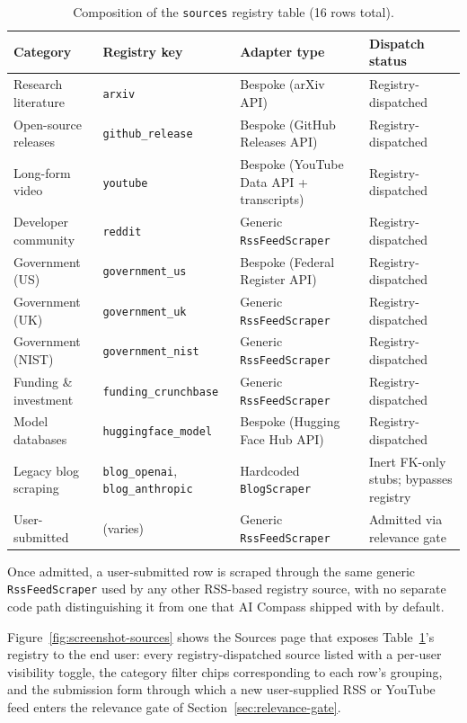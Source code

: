 \begin{table}[htbp]
\centering
\caption{Composition of the \texttt{sources} registry table (16 rows total).}
\label{tab:sources}
\small
\begin{tabular}{|p{2.3cm}|p{3.4cm}|p{4.4cm}|p{2.6cm}|}
\hline
\textbf{Category} & \textbf{Registry key} & \textbf{Adapter type} & \textbf{Dispatch status} \\
\hline
Research literature & \texttt{arxiv} & Bespoke (arXiv API) & Registry-dispatched \\
\hline
Open-source releases & \texttt{github\_\allowbreak release} & Bespoke (GitHub Releases API) & Registry-dispatched \\
\hline
Long-form video & \texttt{youtube} & Bespoke (YouTube Data API + transcripts) & Registry-dispatched \\
\hline
Developer community & \texttt{reddit} & Generic \texttt{RssFeedScraper} & Registry-dispatched \\
\hline
Government (US) & \texttt{government\_\allowbreak us} & Bespoke (Federal Register API) & Registry-dispatched \\
\hline
Government (UK) & \texttt{government\_\allowbreak uk} & Generic \texttt{RssFeedScraper} & Registry-dispatched \\
\hline
Government (NIST) & \texttt{government\_\allowbreak nist} & Generic \texttt{RssFeedScraper} & Registry-dispatched \\
\hline
Funding \& investment & \texttt{funding\_\allowbreak crunchbase} & Generic \texttt{RssFeedScraper} & Registry-dispatched \\
\hline
Model databases & \texttt{huggingface\_\allowbreak model} & Bespoke (Hugging Face Hub API) & Registry-dispatched \\
\hline
Legacy blog scraping & \texttt{blog\_openai}, \texttt{blog\_\allowbreak anthropic} & Hardcoded \texttt{BlogScraper} & Inert FK-only stubs; bypasses registry \\
\hline
User-submitted & (varies) & Generic \texttt{RssFeedScraper} & Admitted via relevance gate \\
\hline
\end{tabular}
\end{table}

Once admitted, a user-submitted row is scraped through the same generic \texttt{RssFeedScraper} used by any other RSS-based registry source, with no separate code path distinguishing it from one that AI Compass shipped with by default.

Figure~\ref{fig:screenshot-sources} shows the Sources page that exposes Table~\ref{tab:sources}'s registry to the end user: every registry-dispatched source listed with a per-user visibility toggle, the category filter chips corresponding to each row's grouping, and the submission form through which a new user-supplied RSS or YouTube feed enters the relevance gate of Section~\ref{sec:relevance-gate}.

